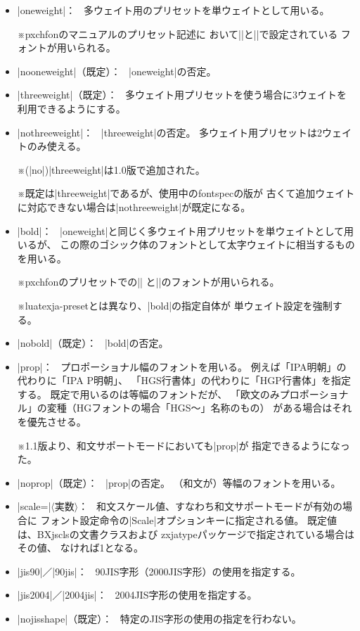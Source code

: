 \documentclass[xelatex,ja=standard,jafont=haranoaji,
  a4paper]{bxjsarticle}
\newcommand{\Pkg}[1]{\textsf{#1}}
\newcommand{\Meta}[1]{$\langle$\mbox{}#1\mbox{}$\rangle$}
\newcommand{\Note}{\par\noindent ※}
\newcommand{\Means}{：\ }
\newcommand{\JSl}{\mbox{／}\linebreak[0]}
\begin{document}
\begin{itemize}
\item |oneweight|\Means
多ウェイト用のプリセットを単ウェイトとして用いる。
\Note \Pkg{pxchfon}のマニュアルのプリセット記述に
おいて|\setminchofont|と|\setgothicfont|で設定されている
フォントが用いられる。
\item |nooneweight|（既定）\Means
|oneweight|の否定。

\item |threeweight|（既定）\Means
多ウェイト用プリセットを使う場合に3ウェイトを利用できるようにする。
\item |nothreeweight|\Means
|threeweight|の否定。
多ウェイト用プリセットは2ウェイトのみ使える。
\Note (|no|)|threeweight|は1.0版で追加された。
\Note 既定は|threeweight|であるが、使用中の\Pkg{fontspec}の版が
古くて追加ウェイトに対応できない場合は|nothreeweight|が既定になる。

\item |bold|\Means
|oneweight|と同じく多ウェイト用プリセットを単ウェイトとして用いるが、
この際のゴシック体のフォントとして太字ウェイトに相当するものを用いる。
\Note \Pkg{pxchfon}のプリセットでの|\setminchofont|%
と|\setboldgothicfont|のフォントが用いられる。
\Note \Pkg{luatexja-preset}とは異なり、|bold|の指定自体が
単ウェイト設定を強制する。
\item |nobold|（既定）\Means
|bold|の否定。

\item |prop|\Means
プロポーショナル幅のフォントを用いる。
例えば「IPA明朝」の代わりに「IPA P明朝」、
「HGS行書体」の代わりに「HGP行書体」を指定する。
既定で用いるのは等幅のフォントだが、
「欧文のみプロポーショナル」の変種（HGフォントの場合「HGS～」名称のもの）
がある場合はそれを優先させる。
\Note 1.1版より、和文サポートモードにおいても|prop|が
指定できるようになった。
\item |noprop|（既定）\Means
|prop|の否定。
（和文が）等幅のフォントを用いる。

\item |scale=|\Meta{実数}\Means
和文スケール値、すなわち和文サポートモードが有効の場合に
フォント設定命令の|Scale|オプションキーに指定される値。
既定値は、\Pkg{BXjscls}の文書クラスおよび
\Pkg{zxjatype}パッケージで指定されている場合はその値、
なければ1となる。

\item |jis90|\JSl|90jis|\Means
90JIS字形（2000JIS字形）の使用を指定する。
\item |jis2004|\JSl|2004jis|\Means
2004JIS字形の使用を指定する。
\item |nojisshape|（既定）\Means
特定のJIS字形の使用の指定を行わない。


\end{itemize}
\end{document}
